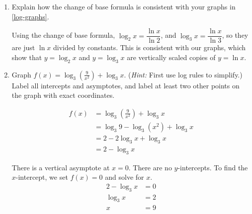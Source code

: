\documentclass{article}
\begin{document}
\begin{enumerate}[resume, topsep=0pt]

\item 


  \begin{problem}[\nstretch{0.75}]
    Explain how the change of base formula is consistent with your graphs in \ref{log-graphs}.
  \end{problem}

  \begin{solution}
    Using the change of base formula, $\log_2{x} = \dfrac{\ln x}{\ln 2}$,
    and $\log_3 {x} = \dfrac{\ln x}{\ln 3}$, so they are just $\ln x$
    divided by constants. This is consistent
    with our graphs, which show that 
    $y=\log_2 x$ and $y=\log_3 x$ are vertically scaled copies of 
    $y=\ln x$.
  \end{solution}

  \pspace{\newpage}

\item  
  \begin{problem}[2.5in]
    Graph $f(x) = \displaystyle \log_3 \left( \frac{9}{x^2} \right) +
    \log_3 x$.  (\textit{Hint:} First use log rules to simplify.)  Label
    all intercepts and asymptotes, and label at least two other points on
    the graph with exact coordinates.
  \end{problem}

  \begin{solution}
    \begin{align*}
      f(x) &= \log_3 \left( \frac{9}{x^2} \right) + \log_3 x \\
      &= \log_3 9 - \log_3 (x^2) + \log_3 x \\
      &= 2 - 2 \log_3 x + \log_3 x \\
      &= 2 - \log_3 x
    \end{align*}

    There is a vertical asymptote at $x=0$. There are no $y$-intercepts.
    To find the $x$-intercept, we set $f(x)=0$ and solve for $x$.
    \begin{align*}
        2 - \log_3 x &= 0 \\
        \log_3 x &= 2 \\
        x &= 9
    \end{align*}

    \begin{center}
    \end{center}
  \end{solution}


\end{enumerate}
\end{document}
